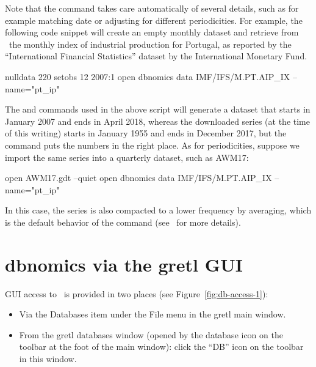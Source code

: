 \documentclass{article}
\begin{document}
Note that the  command takes care automatically of several
details, such as for example matching date or adjusting for different
periodicities. For example, the following code snippet will create an
empty monthly dataset and retrieve from \DB\ the monthly index of
industrial production for Portugal, as reported by the ``International
Financial Statistics'' dataset by the International Monetary Fund.
\begin{code}
  nulldata 220
  setobs 12 2007:1
  open dbnomics
  data IMF/IFS/M.PT.AIP_IX --name="pt_ip"
\end{code}
The  and  commands used in the above script
will generate a dataset that starts in January 2007 and ends in April
2018, whereas the downloaded series (at the time of this writing)
starts in January 1955 and ends in December 2017, but the 
command puts the numbers in the right place. As for periodicities,
suppose we import the same series into a quarterly dataset, such as
AWM17:
\begin{code}
  open AWM17.gdt --quiet
  open dbnomics
  data IMF/IFS/M.PT.AIP_IX --name="pt_ip"
\end{code}
In this case, the series is also compacted to a lower frequency by
averaging, which is the default behavior of the 
command (see \GUG\ for more details).

\section{dbnomics via the gretl GUI}
\label{sec:dbn-gui}

GUI access to \DB\ is provided in two places (see
Figure~\ref{fig:db-access-1}):
\begin{itemize}
\item Via the \textsf{Databases} item under the \textsf{File} menu in
  the gretl main window.
\item From the gretl databases window (opened by the database icon on
  the toolbar at the foot of the main window): click the ``DB'' icon
  on the toolbar in this window.
\end{itemize}
\end{document}
